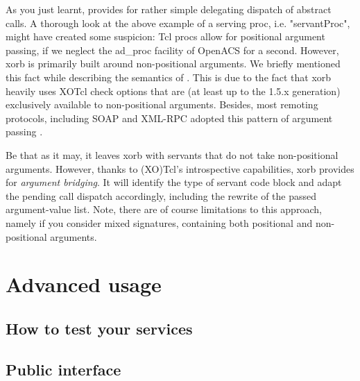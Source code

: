 As you just learnt,  provides for rather simple delegating dispatch of abstract calls. A thorough look at the above example of a serving proc, i.e. "servantProc", might have created some suspicion: Tcl procs allow for positional argument passing, if we neglect the ad\_proc facility of OpenACS for a second. However, xorb is primarily built around non-positional arguments. We briefly mentioned this fact while describing the semantics of . This is due to the fact that xorb heavily uses XOTcl check options that are (at least up to the 1.5.x generation) exclusively available to non-positional arguments. Besides, most remoting protocols, including SOAP and XML-RPC adopted this pattern of argument passing \cite{zdun:2005b}. 

Be that as it may, it leaves xorb with servants that do not take non-positional arguments. However, thanks to (XO)Tcl's introspective capabilities, xorb provides for \emph{argument bridging}. It will identify the type of servant code block and adapt the pending call dispatch accordingly, including the rewrite of the passed argument-value list. Note, there are of course limitations to this approach, namely if you consider mixed signatures, containing both positional and non-positional arguments.


  \section{Advanced usage}\label{sec:advanced}
  \subsection{How to test your services}
    \subsection{Public interface}\label{sec:interface}
